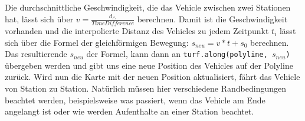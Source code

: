 \begin{newpage}
    Die durchschnittliche Geschwindigkeit, die das Vehicle zwischen zwei Stationen hat, lässt sich über $v = \frac{d_\triangle}{TimeDifference}$ berechnen. Damit ist die Geschwindigkeit vorhanden und die interpolierte Distanz des Vehicles zu jedem Zeitpunkt $t_i$ lässt sich über die Formel der gleichförmigen Bewegung: $s_{neu} = v * t + s_0$ berechnen. Das resultierende $s_{neu}$ der Formel, kann dann an \texttt{turf.along(polyline, $s_{neu}$)} übergeben werden und gibt uns eine neue Position des Vehicles auf der Polyline zurück. Wird nun die Karte mit der neuen Position aktualisiert, fährt das Vehicle von Station zu Station. Natürlich müssen hier verschiedene Randbedingungen beachtet werden, beispielsweise was passiert, wenn das Vehicle am Ende angelangt ist oder wie werden Aufenthalte an einer Station beachtet.

    

    

\end{newpage}